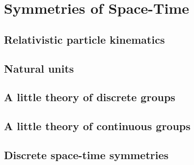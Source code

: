 \section{Symmetries of Space-Time}
\subsection{Relativistic particle kinematics}
\subsection{Natural units}
\subsection{A little theory of discrete groups}
\subsection{A little theory of continuous groups}
\subsection{Discrete space-time symmetries}
